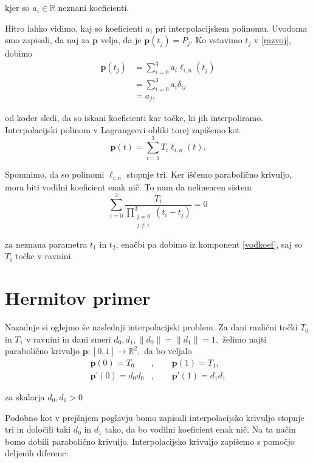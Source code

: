 \documentclass[mat1]{fmfdelo}
\newcommand{\R}{\mathbb R}
\begin{document}
kjer so $a_i \in \R$ neznani koeficienti.

Hitro lahko vidimo, kaj so koeficienti $a_i$ pri interpolacijskem polinomu. Uvodoma smo zapisali, da naj za $\textbf{p}$ velja, da je $\textbf{p}(t_j) = P_j$. Ko vstavimo $t_j$ v \eqref{razvoj}, dobimo
\begin{align*}
\textbf{p}(t_j) &=  \sum_{i=0}^{3} a_i \ell_{i,n}(t_j) \\
	 &= \sum_{i=0}^{3} a_i \delta_{ij} \\
	&= a_j
,\end{align*}

od koder sledi, da so iskani koeficienti kar točke, ki jih interpoliramo. Interpolacijski polinom v Lagrangeevi obliki torej zapišemo kot 
$$\textbf{p}(t) = \sum_{i=0}^{3} T_i \ell_{i,n}(t).$$

Spomnimo, da so polinomi $\ell_{i,n}$ stopnje tri. Ker iščemo parabolično krivuljo, mora biti vodilni koeficient enak nič. To nam da nelinearen sistem
\begin{equation}\label{vodkoef}
\sum_{i = 0}^{3} \frac{T_i}{\prod_{\substack{j = 0 \\ j \neq i}}^3(t_i - t_j)} = 0
\end{equation}

za neznana parametra $t_1$ in $t_2$, enačbi pa dobimo iz komponent \eqref{vodkoef}, saj so $T_i$ točke v ravnini.


\section{Hermitov primer}

Nazadnje si oglejmo še naslednji interpolacijski problem. Za dani različni točki $T_0$ in $T_1$ v ravnini in dani smeri $d_0, d_1, \lVert d_0 \rVert = \lVert d_1 \rVert = 1,$ želimo najti parabolično krivuljo $\textbf{p} : [ 0, 1 ] \rightarrow \R^2,$ da bo veljalo
\begin{align*}
\textbf{p}(0) = T_0&, \qquad \textbf{p}(1) = T_1, \\
\textbf{p'}(0) = d_0 d_0&, \qquad \textbf{p'}(1) = d_1 d_1 
\end{align*}

za skalarja $d_0, d_1 > 0$

Podobno kot v prejšnjem poglavju bomo zapisali interpolacijsko krivuljo stopnje tri in določili taki $d_0$ in $d_1$ tako, da bo vodilni koeficient enak nič. Na ta način bomo dobili parabolično krivuljo. Interpolacijsko krivuljo zapišemo s pomočjo deljenih diferenc:
\end{document}
